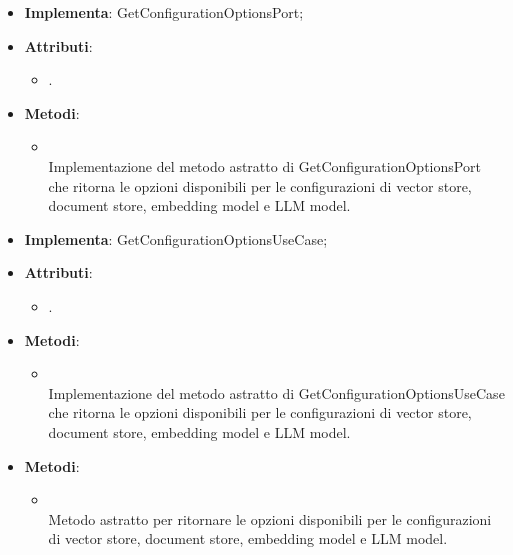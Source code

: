 \documentclass[10pt, a4paper]{article}
\begin{document}
\label{GetConfigurationOptionsPostgresDettaglio}
\begin{itemize}
    \item \textbf{Implementa}: GetConfigurationOptionsPort;
    \item \textbf{Attributi}:
    \begin{itemize}
        \item {}.
    \end{itemize} 
    \item \textbf{Metodi}:
    \begin{itemize}
        \item {}\\
        Implementazione del metodo astratto di GetConfigurationOptionsPort che ritorna le opzioni disponibili per le configurazioni di vector store, document store, embedding model e LLM model.
    \end{itemize}   
\end{itemize}


\label{GetConfigurationOptionsServiceDettaglio}
\begin{itemize}
    \item \textbf{Implementa}: GetConfigurationOptionsUseCase;
    \item \textbf{Attributi}:
    \begin{itemize}
        \item {}.
    \end{itemize} 
    \item \textbf{Metodi}:
    \begin{itemize}
        \item {}\\
        Implementazione del metodo astratto di GetConfigurationOptionsUseCase che ritorna le opzioni disponibili per le configurazioni di vector store, document store, embedding model e LLM model.
    \end{itemize}   
\end{itemize}



\label{GetConfigurationOptionsUseCaseDettaglio}
\begin{itemize}
    \item \textbf{Metodi}:
    \begin{itemize}
        \item {}\\
        Metodo astratto per ritornare le opzioni disponibili per le configurazioni di vector store, document store, embedding model e LLM model.
    \end{itemize}   
\end{itemize}
\end{document}
